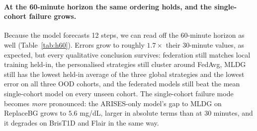 \documentclass[10pt,letterpaper]{article}
\begin{document}
\paragraph{At the 60-minute horizon the same ordering holds, and the
single-cohort failure grows.} Because the model forecasts 12 steps, we can read
off the 60-minute horizon as well (Table~\ref{tab:h60}). Errors grow to roughly
$1.7\times$ their 30-minute values, as expected, but every qualitative
conclusion survives: federation still matches local training held-in, the
personalised strategies still cluster around FedAvg, MLDG still has the lowest
held-in average of the three global strategies and the lowest error on all three
OOD cohorts, and the federated models still beat the mean single-cohort model on
every unseen cohort. The single-cohort failure mode becomes \emph{more}
pronounced: the ARISES-only model's gap to MLDG on ReplaceBG grows to $5.6$
mg/dL, larger in absolute terms than at 30 minutes, and it degrades on BrisT1D
and Flair in the same way.
\end{document}
